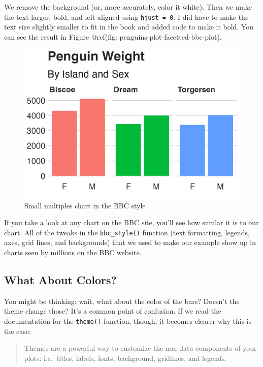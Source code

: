 \documentclass[
]{book}
\begin{document}
We remove the background (or, more accurately, color it white). Then we make the text larger, bold, and left aligned using \texttt{hjust\ =\ 0}. I did have to make the text size slightly smaller to fit in the book and added code to make it bold. You can see the result in Figure @ref(fig: penguins-plot-facetted-bbc-plot).

\begin{figure}
\includegraphics[width=1\linewidth]{custom-theme_files/figure-latex/penguins-plot-facetted-bbc-plot-1} \caption{Small multiples chart in the BBC style}\label{fig:penguins-plot-facetted-bbc-plot}
\end{figure}

If you take a look at any chart on the BBC site, you'll see how similar it is to our chart. All of the tweaks in the \texttt{bbc\_style()} function (text formatting, legends, axes, grid lines, and backgrounds) that we used to make our example show up in charts seen by millions on the BBC website.

\hypertarget{what-about-colors}{%
\subsection*{What About Colors?}\label{what-about-colors}}

You might be thinking: wait, what about the color of the bars? Doesn't the theme change those? It's a common point of confusion. If we read the documentation for the \texttt{theme()} function, though, it becomes clearer why this is the case:

\begin{quote}
Themes are a powerful way to customize the non-data components of your plots: i.e.~titles, labels, fonts, background, gridlines, and legends.
\end{quote}
\end{document}

